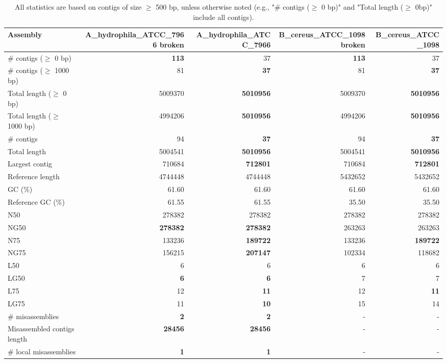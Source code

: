 \documentclass[12pt,a4paper]{article}
\begin{document}
\begin{table}[ht]
\begin{center}
\caption{All statistics are based on contigs of size $\geq$ 500 bp, unless otherwise noted (e.g., "\# contigs ($\geq$ 0 bp)" and "Total length ($\geq$ 0bp)" include all contigs).}
\begin{tabular}{|l*{4}{|r}|}
\hline
Assembly & A\_hydrophila\_ATCC\_7966 broken & A\_hydrophila\_ATCC\_7966 & B\_cereus\_ATCC\_1098 broken & B\_cereus\_ATCC\_1098 \\ \hline
\# contigs ($\geq$ 0 bp) & {\bf 113} & 37 & {\bf 113} & 37 \\ \hline
\# contigs ($\geq$ 1000 bp) & 81 & {\bf 37} & 81 & {\bf 37} \\ \hline
Total length ($\geq$ 0 bp) & 5009370 & {\bf 5010956} & 5009370 & {\bf 5010956} \\ \hline
Total length ($\geq$ 1000 bp) & 4994206 & {\bf 5010956} & 4994206 & {\bf 5010956} \\ \hline
\# contigs & 94 & {\bf 37} & 94 & {\bf 37} \\ \hline
Total length & 5004541 & {\bf 5010956} & 5004541 & {\bf 5010956} \\ \hline
Largest contig & 710684 & {\bf 712801} & 710684 & {\bf 712801} \\ \hline
Reference length & 4744448 & 4744448 & 5432652 & 5432652 \\ \hline
GC (\%) & 61.60 & 61.60 & 61.60 & 61.60 \\ \hline
Reference GC (\%) & 61.55 & 61.55 & 35.50 & 35.50 \\ \hline
N50 & 278382 & 278382 & 278382 & 278382 \\ \hline
NG50 & {\bf 278382} & {\bf 278382} & 263263 & 263263 \\ \hline
N75 & 133236 & {\bf 189722} & 133236 & {\bf 189722} \\ \hline
NG75 & 156215 & {\bf 207147} & 102334 & 118682 \\ \hline
L50 & 6 & 6 & 6 & 6 \\ \hline
LG50 & {\bf 6} & {\bf 6} & 7 & 7 \\ \hline
L75 & 12 & {\bf 11} & 12 & {\bf 11} \\ \hline
LG75 & 11 & {\bf 10} & 15 & 14 \\ \hline
\# misassemblies & {\bf 2} & {\bf 2} & - & - \\ \hline
Misassembled contigs length & {\bf 28456} & {\bf 28456} & - & - \\ \hline
\# local misassemblies & {\bf 1} & {\bf 1} & - & - \\ \hline

\end{tabular}
\end{center}
\end{table}
\end{document}
